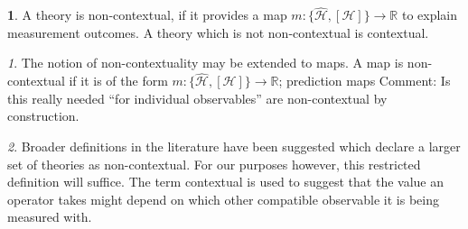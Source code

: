 \documentclass[british,aps,prl,superscriptaddress,nofootinbib,times,reprint]{revtex4-1}
\theoremstyle{plain}
\theoremstyle{definition}
\newtheorem{defn}{\protect\definitionname}
\theoremstyle{remark}
\theoremstyle{remark}
\newtheorem{defnrem}{\protect\remarkname}[defn]
\theoremstyle{remark}
\theoremstyle{plain}
\theoremstyle{plain}
\theoremstyle{plain}
\theoremstyle{definition}
\theoremstyle{definition}
\providecommand{\definitionname}{Definition}
\providecommand{\remarkname}{Remark}
\begin{document}
\begin{defn} A theory is non-contextual, if it
provides a map $m: \{
\hat{\mathcal{H}},[\mathcal{H}] \} \to\mathbb{R}$
to explain measurement outcomes. A theory which is
not non-contextual is contextual.\end{defn}


\begin{defnrem} The notion of non-contextuality may be
extended to maps. A map is non-contextual if it is
of the form $m: \{ \hat{\mathcal{H}},[\mathcal{H}]
\} \to\mathbb{R}$; prediction maps {\color{red}Comment: Is this really needed ``for individual
observables''} are non-contextual by construction.  
\end{defnrem}
\begin{defnrem}
Broader definitions in the literature have been
suggested which declare a larger set of theories
as non-contextual. For our purposes however, this
restricted definition will suffice. The term
contextual is used to suggest that the value an
operator takes might depend on which other
compatible observable it is being  measured with.
\end{defnrem}
\end{document}
